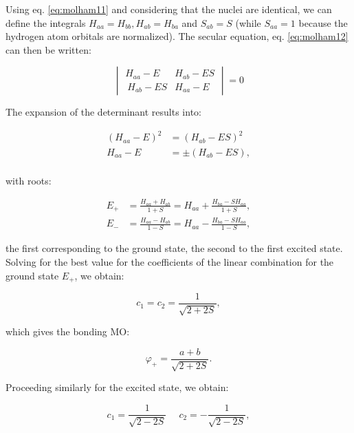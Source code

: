 \documentclass[
  9pt,
]{extbook}
\theoremstyle{definition}
\theoremstyle{definition}
\theoremstyle{definition}
\theoremstyle{remark}
\begin{document}
Using eq. \eqref{eq:molham11} and considering that the nuclei are identical, we can define the integrals \(H_{aa}=H_{bb}, H_{ab}=H_{ba}\) and \(S_{ab}=S\) (while \(S_{aa}=1\) because the hydrogen atom orbitals are normalized). The secular equation, eq. \eqref{eq:molham12} can then be written:

\begin{equation}
\begin{vmatrix}
H_{aa}-E   & H_{ab}-ES \\\
H_{ab}-ES  & H_{aa}-E
\end{vmatrix}=0
\label{eq:bond4}
\end{equation}

The expansion of the determinant results into:

\begin{equation}
\begin{aligned}
(H_{aa}-E)^2 &=(H_{ab}-ES)^2 \\
H_{aa}-E &= \pm (H_{ab}-ES), \\
\end{aligned}
\label{eq:bond5}
\end{equation}

with roots:

\begin{equation}
\begin{aligned}
E_{+} &= \frac{H_{aa}+H_{ab}}{1+S} = H_{aa}+\frac{H_{ba}-SH_{aa}}{1+S}, \\
E_{-} &= \frac{H_{aa}-H_{ab}}{1-S} = H_{aa}-\frac{H_{ba}-SH_{aa}}{1-S}, 
\end{aligned}
\label{eq:bond6}
\end{equation}

the first corresponding to the ground state, the second to the first excited state. Solving for the best value for the coefficients of the linear combination for the ground state \(E_{+}\), we obtain:

\begin{equation}
c_1=c_2=\frac{1}{\sqrt{2+2S}},
\label{eq:bond7}
\end{equation}

which gives the bonding MO:

\begin{equation}
\varphi_{+}=\frac{a+b}{\sqrt{2+2S}}.
\label{eq:bond8}
\end{equation}

Proceeding similarly for the excited state, we obtain:

\begin{equation}
c_1=\frac{1}{\sqrt{2-2S}}\;\quad c_2=-\frac{1}{\sqrt{2-2S}},
\label{eq:bond9}
\end{equation}
\end{document}
